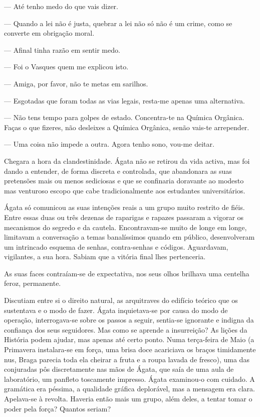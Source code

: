 --- Até tenho medo do que vais dizer.

--- Quando a lei não é justa, quebrar a lei não só não é um crime, como se
  converte em obrigação moral.

--- Afinal tinha razão em sentir medo.

--- Foi o Vasques quem me explicou isto.

--- Amiga, por favor, não te metas em sarilhos.

--- Esgotadas que foram todas as vias legais, resta-me apenas uma
  alternativa.

--- Não tens tempo para golpes de estado. Concentra-te na Química
  Orgânica. Faças o que fizeres, não desleixes a Química Orgânica, senão
  vais-te arrepender.

--- Uma coisa não impede a outra. Agora tenho sono, vou-me deitar.

Chegara a hora da clandestinidade. Ágata não se retirou da vida activa,
mas foi dando a entender, de forma discreta e controlada, que abandonara
as suas pretensões mais ou menos sediciosas e que se confinaria
doravante ao modesto mas venturoso escopo que cabe tradicionalmente
aos estudantes universitários.

Ágata só comunicou as suas intenções reais a um grupo muito restrito de
fiéis. Entre essas duas ou três dezenas de raparigas e rapazes
passaram a vigorar os mecanismos do segredo e da cautela. Encontravam-se
muito de longe em longe, limitavam a conversação a temas banalíssimos
quando em público, desenvolveram um intrincado esquema de senhas, contra-senhas e códigos. Aguardavam, vigilantes, a sua hora. Sabiam que a
vitória final lhes pertenceria.

As suas faces contraíam-se de expectativa, nos seus olhos brilhava uma
centelha feroz, permanente.

Discutiam entre si o direito natural, as arquitraves do edifício
teórico que os sustentava e o modo de fazer. Ágata inquietava-se por
causa do modo de operação, interrogava-se sobre os passos a seguir,
sentia-se ignorante e indigna da confiança dos seus seguidores. Mas como
se aprende a insurreição? As lições da História podem ajudar, mas apenas
até certo ponto. Numa terça-feira de Maio (a Primavera instalara-se em
força, uma brisa doce acariciava os braços timidamente nus, Braga
parecia toda ela cheirar a fruta e a roupa lavada de fresco), uma das
conjuradas pôs discretamente nas mãos de Ágata, que saía de uma aula de
laboratório, um panfleto toscamente impresso. Ágata examinou-o com
cuidado. A gramática era péssima, a qualidade gráfica deplorável, mas a
mensagem era clara. Apelava-se à revolta. Haveria então mais um grupo,
além deles, a tentar tomar o poder pela força? Quantos seriam?

